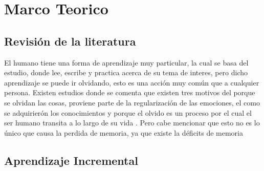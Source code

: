 \section{Marco Teorico}

    \subsection{Revisión de la literatura}
        El humano tiene una forma de aprendizaje muy particular, la cual se basa del estudio, donde lee, escribe y practica acerca de
        su tema de interes, pero dicho aprendizaje se puede ir olvidando, esto es una acción muy común que a cualquier persona.
        Existen estudios donde se comenta que existen tres motivos del porque se olvidan las cosas, proviene parte de la regularización de las emociones,
        el como se adquirierón los conocimientos y porque el olvido es un proceso por el cual el ser humano transita a lo largo de su vida \cite{Nrby2015}. Pero cabe
        mencionar que esto no es lo único que causa la perdida de memoria, ya que existe la déficits de memoria 

    \subsection{Aprendizaje Incremental}
        